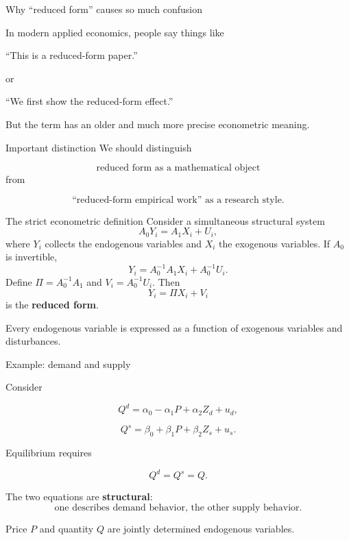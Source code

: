 \documentclass[aspectratio=169,11pt]{beamer}
\begin{document}
\begin{frame}{Why ``reduced form'' causes so much confusion}

In modern applied economics, people say things like

\begin{center}
``This is a reduced-form paper.''
\end{center}

or

\begin{center}
``We first show the reduced-form effect.''
\end{center}

But the term has an older and much more precise econometric meaning.

\vspace{0.4em}

\begin{alertblock}{Important distinction}
We should distinguish

\[
\boxed{\text{reduced form as a mathematical object}}
\]
from

\[
\boxed{\text{``reduced-form empirical work'' as a research style}.}
\]
\end{alertblock}

\end{frame}

\begin{frame}{The strict econometric definition}
Consider a simultaneous structural system
\[
A_0Y_i = A_1X_i + U_i,
\]
where $Y_i$ collects the endogenous variables and $X_i$ the exogenous
variables. If $A_0$ is invertible,
\[
Y_i = A_0^{-1}A_1X_i + A_0^{-1}U_i.
\]
Define $\Pi=A_0^{-1}A_1$ and $V_i=A_0^{-1}U_i$. Then
\[
\boxed{Y_i=\Pi X_i+V_i}
\]
is the \textbf{reduced form}.

\vspace{0.25em}

Every endogenous variable is expressed as a function of
exogenous variables and disturbances.
\end{frame}

\begin{frame}{Example: demand and supply}

Consider

\[
Q^d
=
\alpha_0
-
\alpha_1P
+
\alpha_2Z_d
+
u_d,
\]

\[
Q^s
=
\beta_0
+
\beta_1P
+
\beta_2Z_s
+
u_s.
\]

Equilibrium requires

\[
Q^d=Q^s=Q.
\]

The two equations are \textbf{structural}:
\[
\boxed{
\text{one describes demand behavior,
the other supply behavior.}
}
\]

Price $P$ and quantity $Q$ are jointly determined endogenous variables.

\end{frame}
\end{document}
